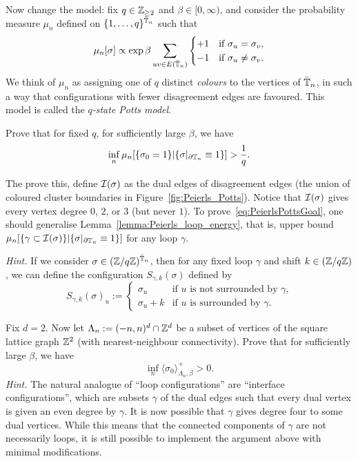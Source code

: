 \begin{exercise}
    Now change the model: fix $q\in\mathbb Z_{\geq 2}$ and $\beta\in[0,\infty)$,
    and consider the probability measure $\mu_n$ defined on $\{1,\ldots,q\}^{\bar{\mathbb T}_n}$
    such that
    \[
        \mu_n[\sigma]\propto \exp\beta \sum_{uv\in E(\bar\T_n)}
        \begin{cases}
            +1 &\text{if $\sigma_u=\sigma_v$,}
            \\
            -1 &\text{if $\sigma_u\neq\sigma_v$.}
        \end{cases}
    \]
    We think of $\mu_n$ as assigning one of $q$ distinct \emph{colours}
    to the vertices of $\bar{\mathbb T}_n$, in such a way that configurations with fewer
    disagreement edges are favoured.
    This model is called the \emph{$q$-state Potts model}.

    Prove that for fixed $q$, for sufficiently large $\beta$, we have
    \begin{equation}
        \label{eq:PeierlsPottsGoal}
        \inf_n\mu_n[\{\sigma_0=1\}|\{\sigma|_{\partial\T_n}\equiv 1\}]> \frac1q.
    \end{equation}

    The prove this,
    define $\mathcal I(\sigma)$ as the dual edges of disagreement edges
    (the union of coloured cluster boundaries in Figure~\ref{fig:Peierls_Potts}).
    Notice that $\mathcal I(\sigma)$ gives every vertex degree $0$, $2$, or $3$
    (but never $1$).
    To prove~\eqref{eq:PeierlsPottsGoal},
    one should generalise Lemma~\ref{lemma:Peierls_loop_energy}, that is, upper bound
    $\mu_n[\{\gamma\subset\mathcal I(\sigma)\}|\{\sigma|_{\partial\mathbb T_n}\equiv 1\}]$
    for any loop $\gamma$.

    \emph{Hint.}
    If we consider $\sigma\in(\mathbb Z/q\mathbb Z)^{\bar{\mathbb T}_n}$, then for any fixed loop $\gamma$
    and shift $k\in(\mathbb Z/q\mathbb Z)$, we can define the configuration $S_{\gamma,k}(\sigma)$
    defined by
    \[
        S_{\gamma,k}(\sigma)_u:=
        \begin{cases}
            \sigma_u &\text{if $u$ is not surrounded by $\gamma$,}\\
            \sigma_u+k&\text{if $u$ is surrounded by $\gamma$.}
        \end{cases}
    \]
\end{exercise}

\begin{exercise}
    Fix $d=2$.
    Now let $\Lambda_n:=(-n,n)^d\cap\mathbb Z^d$ be a subset of vertices
    of the square lattice graph $\mathbb Z^2$ (with nearest-neighbour connectivity).
    Prove that for sufficiently large $\beta$, we have
    \[
        \inf_n\langle\sigma_0\rangle_{\Lambda_n,\beta}^+>0.
    \]
    \emph{Hint.}
    The natural analogue of ``loop configurations'' are
    ``interface configurations'', which are subsets $\gamma$ of the dual edges
    such that every dual vertex is given an even degree by $\gamma$.
    It is now possible that $\gamma$ gives degree four to some dual vertices.
    While this means that the connected components of $\gamma$ are not necessarily loops,
    it is still possible to implement the argument above with minimal modifications.
\end{exercise}


